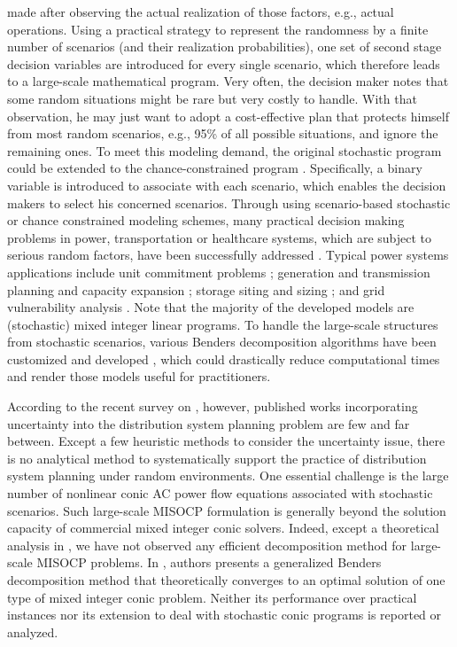 \documentclass[journal]{IEEEtran}
\theoremstyle{remark}
\begin{document}
made after observing the actual realization of those factors, e.g., actual operations.
Using a practical strategy to represent the randomness by a finite number of scenarios (and their realization probabilities), one set of second stage decision variables are introduced for every single scenario, which therefore leads to a large-scale mathematical program. Very often, the decision maker notes that some random situations might be rare but very costly to handle. With that observation,  he may just want to adopt a cost-effective plan that protects himself from most random scenarios, e.g., 95\% of all possible situations, and ignore the remaining ones. To meet this modeling demand, the original  stochastic program could be extended to the chance-constrained program \citep{ahmed2008solving}. Specifically, a binary variable is introduced to associate with each scenario, which enables the decision makers to select his concerned scenarios.
Through using scenario-based stochastic or chance constrained modeling schemes, many practical decision making problems in power, transportation or healthcare systems, which are subject to serious random factors, have been successfully addressed \citep{birge2011introduction,ahmed2008solving}. Typical power systems applications include unit commitment problems \citep{Takriti_1996,wang2012chance,Zheng_2015}; generation and transmission  planning and capacity expansion \citep{Gil_2014,parpas2014stochastic}; storage siting and sizing \citep{baker2014optimal,kuznia2013stochastic}; and grid vulnerability analysis \citep{cormican1995computational,janjarassuk2008reformulation}. Note that the majority of the developed models are (stochastic) mixed integer linear programs. To handle the large-scale structures from stochastic scenarios, various Benders decomposition algorithms have been customized and developed \citep{benders1962partitioning,van1969shaped,shahidehopour2005benders}, which could drastically reduce computational times and render those models useful for practitioners.\par
According to the recent survey on \citep{ganguly2013recent}, however, published works incorporating uncertainty into the distribution system planning problem are few and far between.  Except a few heuristic methods \citep{Heurist_1,Heurist_2,Heurist_3} to consider the  uncertainty issue, there is no analytical method to systematically support the practice of distribution system planning under random environments. One essential challenge is the large number of nonlinear conic AC power flow equations associated with stochastic scenarios. Such large-scale MISOCP formulation is generally beyond the solution capacity of commercial mixed integer conic solvers. Indeed, except a theoretical analysis in \citep{wei2015generalized}, we have not observed any efficient decomposition method for large-scale MISOCP problems. In \citep{wei2015generalized},  authors presents a generalized Benders decomposition method that theoretically converges to an optimal solution of one type of mixed integer conic problem. Neither its performance over practical instances nor its extension to deal with stochastic conic programs is reported or analyzed.
\end{document}
